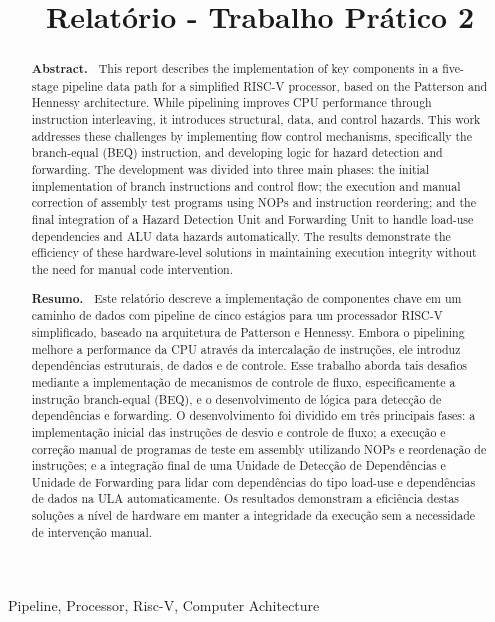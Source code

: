 \documentclass{sbc2023}%
\title[Presenting the JBCS template]{Relatório - Trabalho Prático 2}
\author[Viterbo et al. 202X]{
\affil{\textbf{Antônio Drumond Cota de Souza}}

\affil{\textbf{Davi Ferreira Puddo}}

\affil{\textbf{Gabriel Valedo Batista Silva}}

\affil{\textbf{Mateus Henrique Medeiros Diniz}}

\affil{\textbf{Raquel de Parde Motta}}
}
\begin{document}
\begin{frontmatter}
\maketitle

\begin{abstract}
\textbf{Abstract.~}
\noindent This report describes the implementation of key components in a five-stage pipeline data path for a simplified RISC-V processor, based on the Patterson and Hennessy architecture. While pipelining improves CPU performance through instruction interleaving, it introduces structural, data, and control hazards. This work addresses these challenges by implementing flow control mechanisms, specifically the branch-equal (BEQ) instruction, and developing logic for hazard detection and forwarding. The development was divided into three main phases: the initial implementation of branch instructions and control flow; the execution and manual correction of assembly test programs using NOPs and instruction reordering; and the final integration of a Hazard Detection Unit and Forwarding Unit to handle load-use dependencies and ALU data hazards automatically. The results demonstrate the efficiency of these hardware-level solutions in maintaining execution integrity without the need for manual code intervention. 
\end{abstract}

\begin{abstract}
\textbf{Resumo.~}
\noindent Este relatório descreve a implementação de componentes chave em um caminho de dados com pipeline de cinco estágios para um processador RISC-V simplificado, baseado na arquitetura de Patterson e Hennessy. Embora o pipelining melhore a performance da CPU através da intercalação de instruções, ele introduz dependências estruturais, de dados e de controle. Esse trabalho aborda tais desafios mediante a implementação de mecanismos de controle de fluxo, especificamente a instrução branch-equal (BEQ), e o desenvolvimento de lógica para detecção de dependências e forwarding. O desenvolvimento foi dividido em três principais fases: a implementação inicial das instruções de desvio e controle de fluxo; a execução e correção manual de programas de teste em assembly utilizando NOPs e reordenação de instruções; e a integração final de uma Unidade de Detecção de Dependências e Unidade de Forwarding para lidar com dependências do tipo load-use e dependências de dados na ULA automaticamente. Os resultados demonstram a eficiência destas soluções a nível de hardware em manter a integridade da execução sem a necessidade de intervenção manual.
\end{abstract}

\begin{keywords}
Pipeline, Processor, Risc-V, Computer Achitecture
\end{keywords}


\end{frontmatter}
\end{document}
